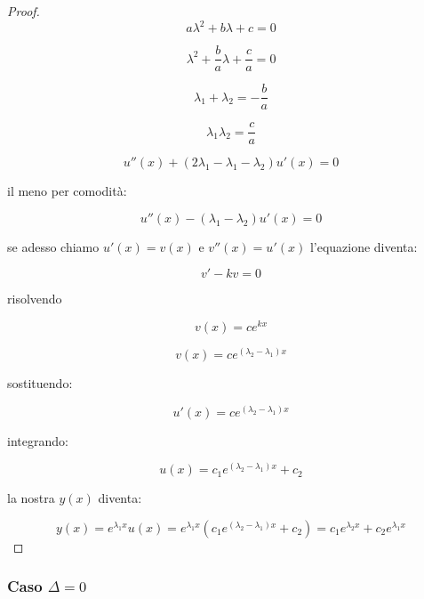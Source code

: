 \begin{proof}
    \[
        a \lambda^{2} + b \lambda + c =0
    \]

    \[
        \lambda^{2} + \frac{b}{a} \lambda + \frac{c}{a} =0
    \]

    \[
        \lambda_1 + \lambda_2 = -\frac{b}{a}
    \]

    \[
        \lambda_1  \lambda_2 = \frac{c}{a}
    \]

    \[
        u''(x) + (2 \lambda_1 - \lambda_1 - \lambda_2)u'(x) = 0
    \]

    il meno per comodità:

    \[
        u''(x) - (\lambda_1 - \lambda_2)u'(x) = 0
    \]

    se adesso chiamo \(u'(x)=v(x)\) e \(v''(x) = u'(x)\) l'equazione diventa:

    \[
        v' -kv = 0
    \]

    risolvendo

    \[
        v(x) = ce ^{kx}
    \]

    \[
        v(x) = c e^{(\lambda_2 - \lambda_1)x}
    \]

    sostituendo:

    \[
        u'(x) = c e ^{(\lambda_2- \lambda_1)x}
    \]

    integrando:

    \[
        u(x)  = c_1 e ^{(\lambda_2 - \lambda_1)x}+c_2
    \]

    la nostra \(y(x)\) diventa:

    \[
        y(x) = e ^{\lambda_1 x}u(x) = e ^{\lambda_1 x}( c_1 e ^{(\lambda_2 - \lambda_1)x}+c_2) = c_1 e ^{\lambda_2 x}+ c_2 e ^{\lambda_1 x}
    \]
\end{proof}

\filbreak{}

\subsubsection*{Caso \(\Delta = 0\)}

